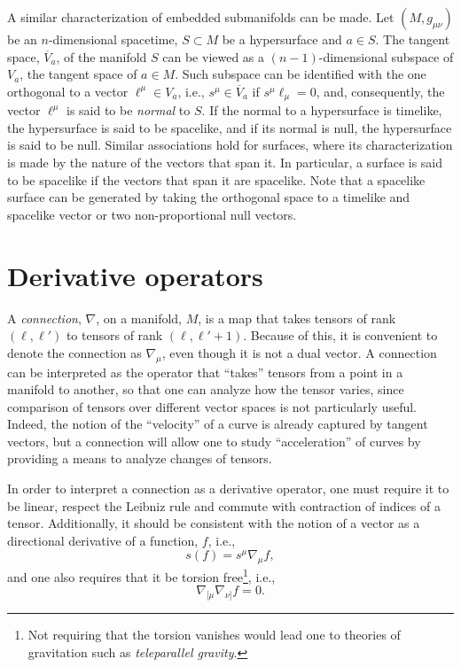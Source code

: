 \documentclass[
12pt,		%
openright,	%
twoside,  %
a4paper,			%
chapter=TITLE,		%
english,			%
french,				%
spanish,			%
brazil				%
]{USPSC-classe/USPSC}
\begin{document}
\begin{apendicesenv}
A similar characterization of embedded submanifolds can be made. Let $(M,g_{\mu\nu})$ be an $n$-dimensional spacetime, $S\subset M$ be a hypersurface and $a\in S$. The tangent space, $\overline{V}_a$, of the manifold $S$ can be viewed as a $(n-1)$-dimensional subspace of $V_a$, the tangent space of $a\in M$. Such subspace can be identified with the one orthogonal to a vector $\ell^{\mu}\in V_a$, i.e., $s^{\mu}\in\overline{V}_a$ if $s^{\mu}\ell_{\mu}=0$, and, consequently, the vector $\ell^{\mu}$ is said to be \textit{normal} to $S$. If the normal to a hypersurface is timelike, the hypersurface is said to be spacelike, and if its normal is null, the hypersurface is said to be null. Similar associations hold for surfaces, where its characterization is made by the nature of the vectors that span it. In particular, a surface is said to be spacelike if the vectors that span it are spacelike. Note that a spacelike surface can be generated by taking the orthogonal space to a timelike and spacelike vector or two non-proportional null vectors.

\section{Derivative operators}\label{derivativeoperators}

A \textit{connection}, $\nabla$, on a manifold, $M$, is a map that takes tensors of rank $(\ell,\ell')$ to tensors of rank $(\ell,\ell'+1)$. Because of this, it is convenient to denote the connection as $\nabla_{\mu}$, even though it is not a dual vector. A connection can be interpreted as the operator that ``takes'' tensors from a point in a manifold to another, so that one can analyze how the tensor varies, since comparison of tensors over different vector spaces is not particularly useful. Indeed, the notion of the ``velocity'' of a curve is already captured by tangent vectors, but a connection will allow one to study ``acceleration'' of curves by providing a means to analyze changes of tensors.

In order to interpret a connection as a derivative operator, one must require it to be linear, respect the Leibniz rule and commute with contraction of indices of a tensor. Additionally, it should be consistent with the notion of a vector as a directional derivative of a function, $f$, i.e., 
\begin{equation}\label{aeq2}
    s(f)=s^{\mu}\nabla_{\mu}f,
\end{equation}
and one also requires that it be torsion free\footnote{Not requiring that the torsion vanishes would lead one to theories of gravitation such as \textit{teleparallel gravity}.}, i.e., 
\begin{equation}\label{aeq3}
    \nabla_{[\mu}\nabla_{\nu]}f=0.
\end{equation}


\end{apendicesenv}
\end{document}
